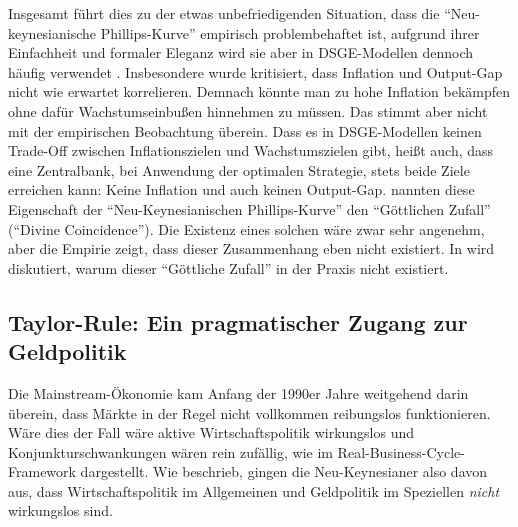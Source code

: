 Insgesamt führt dies zu der etwas unbefriedigenden Situation, dass die "`Neu-keynesianische Phillips-Kurve"' empirisch problembehaftet ist, aufgrund ihrer Einfachheit und formaler Eleganz wird sie aber in DSGE-Modellen dennoch häufig verwendet \parencite[S. 341]{Romer2019}. Insbesondere wurde kritisiert, dass Inflation und Output-Gap nicht wie erwartet korrelieren. Demnach könnte man zu hohe Inflation bekämpfen ohne dafür Wachstumseinbußen hinnehmen zu müssen. Das stimmt aber nicht mit der empirischen Beobachtung überein. Dass es in DSGE-Modellen keinen Trade-Off zwischen Inflationszielen und Wachstumszielen gibt, heißt auch, dass eine Zentralbank, bei Anwendung der optimalen Strategie, stets beide Ziele erreichen kann: Keine Inflation und auch keinen Output-Gap. \textcite{Blanchard2005} nannten diese Eigenschaft der "`Neu-Keynesianischen Phillips-Kurve"' den "`Göttlichen Zufall"' ("`Divine Coincidence"'). Die Existenz eines solchen wäre zwar sehr angenehm, aber die Empirie zeigt, dass dieser Zusammenhang eben nicht existiert. In \textcite{Gali1999, Gali2015, Blanchard2005} wird diskutiert, warum dieser "`Göttliche Zufall"' in der Praxis nicht existiert.


\subsection{Taylor-Rule: Ein pragmatischer Zugang zur Geldpolitik}
\label{Taylor}
Die Mainstream-Ökonomie kam Anfang der 1990er Jahre weitgehend darin überein, dass Märkte in der Regel nicht vollkommen reibungslos funktionieren. Wäre dies der Fall wäre aktive Wirtschaftspolitik wirkungslos und Konjunkturschwankungen wären rein zufällig, wie im Real-Business-Cycle-Framework dargestellt. Wie \textcite[S. 823]{Akerlof1985} beschrieb, gingen die Neu-Keynesianer also davon aus, dass Wirtschaftspolitik im Allgemeinen und Geldpolitik im Speziellen \textit{nicht} wirkungslos sind.

